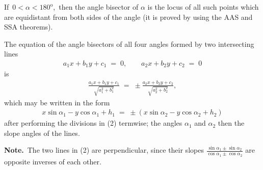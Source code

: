 \documentclass[12pt]{article}
\theoremstyle{definition}
\begin{document}
If\, $0 < \alpha < 180^{\mathrm{o}}$,\, then the angle bisector of $\alpha$ is the locus of all such points which are equidistant from both sides of the angle (it is proved by using the AAS and SSA theorems).

The equation of the angle bisectors of all four angles formed by two intersecting lines
\begin{align}
a_1x\!+\!b_1y\!+\!c_1 \;=\; 0,\qquad a_2x\!+\!b_2y\!+\!c_2 \;=\; 0
\end{align}
is
\begin{align}
\frac{a_1x\!+\!b_1y\!+\!c_1}{\sqrt{a_1^2\!+\!b_1^2}} \;=\; \pm\frac{a_2x\!+\!b_2y\!+\!c_2}{\sqrt{a_2^2\!+\!b_2^2}},
\end{align}
which may be written in the form
\begin{align}
x\sin\alpha_1-y\cos\alpha_1+h_1 \;=\; \pm(x\sin\alpha_2-y\cos\alpha_2+h_2)
\end{align}
after performing the divisions in (2) termwise; the angles $\alpha_1$ and $\alpha_2$  then the slope angles of the lines.

\textbf{Note.}\, The two lines in (2) are perpendicular, since their slopes
$\displaystyle\frac{\sin\alpha_1\pm\sin\alpha_2}{\cos\alpha_1\pm\cos\alpha_2}$ are opposite inverses of each other.

\end{document}
